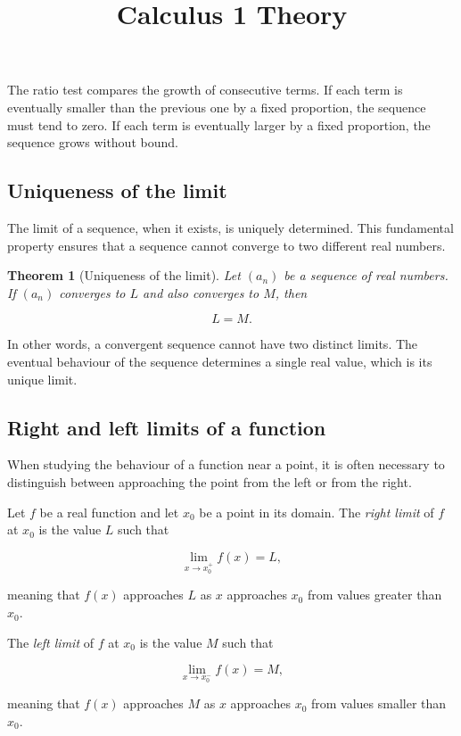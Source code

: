 \documentclass[11pt,a4paper]{article} \usepackage[T1]{fontenc}
\theoremstyle{plain} \newtheorem{theorem}{Theorem} \title{Calculus 1 Theory}
\begin{document}
The ratio test compares the growth of consecutive terms. If each term is
eventually smaller than the previous one by a fixed proportion, the sequence
must tend to zero. If each term is eventually larger by a fixed proportion, the
sequence grows without bound.

\subsection{Uniqueness of the limit}

The limit of a sequence, when it exists, is uniquely determined. This
fundamental property ensures that a sequence cannot converge to two different
real numbers.

\begin{theorem}
[Uniqueness of the limit] Let $(a_n)$ be a sequence of real numbers. If $(a_n)$
converges to $L$ and also converges to $M$, then

\[
L = M.
\]

\end{theorem}

In other words, a convergent sequence cannot have two distinct limits. The
eventual behaviour of the sequence determines a single real value, which is its
unique limit.

\subsection{Right and left limits of a function}

When studying the behaviour of a function near a point, it is often necessary
to distinguish between approaching the point from the left or from the right.

\begin{definition}
 Let $f$ be a real function and let $x_0$ be a point in its
domain. The \emph{right limit} of $f$ at $x_0$ is the value $L$ such that

\[
\lim_{x \to x_0^+} f(x) = L,
\]

meaning that $f(x)$ approaches $L$ as $x$ approaches $x_0$ from values greater
than $x_0$.
\end{definition}

\begin{definition}
 The \emph{left limit} of $f$ at $x_0$ is the value $M$ such that

\[
\lim_{x \to x_0^-} f(x) = M,
\]

meaning that $f(x)$ approaches $M$ as $x$ approaches $x_0$ from values smaller
than $x_0$.
\end{definition}
\end{document}
